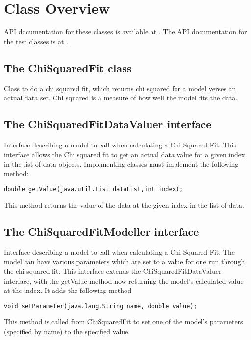 \documentclass[10pt,a4paper]{article}
\begin{document}
\section{Class Overview}
API documentation for these classes is available at \cite{bib:ngatmathapi}.
The API documentation for the test classes is at \cite{bib:ngatmathtestapi}.

\subsection{The ChiSquaredFit class}
Class to do a chi squared fit, which returns chi squared for a model verses an actual data set. 
Chi squared is a measure of how well the model fits the data. 

\subsection{The ChiSquaredFitDataValuer interface}
Interface describing a model to call when calculating a Chi Squared Fit. 
This interface allows the Chi squared fit to get an actual data value for a given index in the list of data objects. 
Implementing classes must implement the following method:
\begin{verbatim}
double getValue(java.util.List dataList,int index);
\end{verbatim}
This method returns the value of the data at the given index in the list of data. 

\subsection{The ChiSquaredFitModeller interface}
Interface describing a model to call when calculating a Chi Squared Fit. 
The model can have various parameters which are set to a value for one run through the chi squared fit. 
This interface extends the ChiSquaredFitDataValuer interface, with the getValue method now returning
the model's calculated value at the index. It adds the following method
\begin{verbatim}
void setParameter(java.lang.String name, double value);
\end{verbatim}
This method is called from ChiSquaredFit to set one of the model's parameters (specified by name) to
the specified value.
\end{document}

